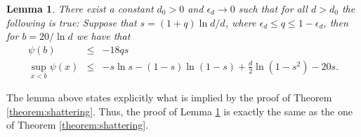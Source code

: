 \documentclass[a4paper,10pt]{article}
\makeatletter
\newcommand{\remove}[1]{}
\newtheorem{lemma}{Lemma}\renewcommand{\thelemma}{\arabic{lemma}}
\newenvironment{proof}{\noindent{\bf Proof\@:}}{\hfill $\Box$\\}
\newcommand\bc[1]{\left({#1}\right)}
\makeatother
\begin{document}
\begin{lemma}\label{lemma:SameAsShaterringThrm}
There exist a constant $d_0>0$ and $\epsilon_d\to 0$ such that for
all $d>d_0$ the following is true:
Suppose that $s=(1+q)\ln d/d$, where $\epsilon_d\leq q\leq 1-\epsilon_d$,
then for $b=20/\ln d$  we have that
\begin{eqnarray}
\psi(b)&\leq& -18 qs \label{eq:PsiBound} \\
\sup_{x<b}\psi(x)&\leq &
-s\ln s-(1-s)\ln(1-s)+\frac{d}{2}\ln(1-s^2)-20s.
\label{eq:PsiSupBound} 
\end{eqnarray}
\end{lemma}
The lemma above states explicitly what is implied by the proof of 
Theorem \ref{theorem:shattering}. Thus, the proof of Lemma  \ref{lemma:SameAsShaterringThrm} 
is exactly the same as the one of Theorem \ref{theorem:shattering}.

\remove{
\begin{proof}
Let $\epsilon_d=100\ln\ln d/\ln d$. Assume that $k=(1+q)\ln d/d$ for some
$q\in [\epsilon_d,1-\epsilon_d]$. Consider the functions $\psi(x)$ 
and $\xi(x,y)$ as defined in the statement of Lemma
\ref{lemma:PsiXiExpctation}. 
Working as in the proof of Theorem \ref{theorem:shattering} (i.e. (\ref{eqpftheorem:shattering1}))
we get that
\begin{equation}\label{eq:psi(c)bound}
\psi(x)\leq sx\left(2-2\ln x-q\ln d+dsx/2\right)
\end{equation}
  Furthermore, for $x=b$ 
we get that 
\begin{eqnarray}
\psi(b)&\leq & b s\left(22+2\ln\ln d-\ln20-q\ln d\right)\leq -\frac{9}{10}bsq\ln d\leq -18qs.  \end{eqnarray}
From (\ref{eq:psi(c)bound}), for any $\beta<b$ we get that
\begin{eqnarray}
\psi(\beta)&\leq& \beta s\left(22-2\ln \beta-100\ln \ln d\right) \qquad \mbox{[as $d\beta s<40$]}\nonumber \\
&\leq& -2\beta s \ln \beta \leq s, \label{eq:psi(beta)UBound}
\end{eqnarray}
since $-x\ln x<1/2$ for every $x>0$.
By comparison, for $s=(1+q)\ln d/d$ we have
	\begin{eqnarray}
	-s\ln(s)-(1-s)\ln(1-s)+\frac{d}2\ln(1-s^2)&\geq&
		-s\ln s+s-\frac{ds^2}2-\frac{ds^4}2
			\quad\mbox{[using $\ln(1-x)\geq-x-x^2$]}\nonumber\\
		&\geq&s\bc{-\ln s-ds/2+1}\nonumber\\
		&\geq&s\bc{\frac{1-q}{2}\ln d-\ln\ln d+1}\geq 40s \ln\ln d.
		\label{eq:InverseExpctLbound}
	\end{eqnarray}
From  (\ref{eq:InverseExpctLbound}) and (\ref{eq:psi(beta)UBound}),
it is direct that (\ref{eq:PsiSupBound}) holds.
\end{proof}
}
\end{document}
